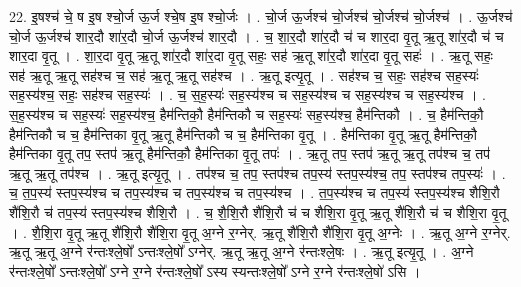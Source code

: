 \documentclass[17pt]{extarticle}
\begin{document}
22. इ॒षश्च॑ चे॒ ष इ॒ष श्चो॒र्ज ऊ॒र्ज श्चे॒ष इ॒ष श्चो॒र्जः । . चो॒र्ज ऊ॒र्जश्च॑ चो॒र्जश्च॑ चो॒र्जश्च॑ चो॒र्जश्च॑ । . ऊ॒र्जश्च॑ चो॒र्ज ऊ॒र्जश्च॑ शार॒दौ शा॑र॒दौ चो॒र्ज ऊ॒र्जश्च॑ शार॒दौ । . च॒ शा॒र॒दौ शा॑र॒दौ च॑ च शार॒दा वृ॒तू ऋ॒तू शा॑र॒दौ च॑ च शार॒दा वृ॒तू । . शा॒र॒दा वृ॒तू ऋ॒तू शा॑र॒दौ शा॑र॒दा वृ॒तू सहः॒ सह॑ ऋ॒तू शा॑र॒दौ शा॑र॒दा वृ॒तू सहः॑ । . ऋ॒तू सहः॒ सह॑ ऋ॒तू ऋ॒तू सह॑श्च च॒ सह॑ ऋ॒तू ऋ॒तू सह॑श्च । . ऋ॒तू इत्यृ॒तू । . सह॑श्च च॒ सहः॒ सह॑श्च सह॒स्यः॑ सह॒स्य॑श्च॒ सहः॒ सह॑श्च सह॒स्यः॑ । . च॒ स॒ह॒स्यः॑ सह॒स्य॑श्च च सह॒स्य॑श्च च सह॒स्य॑श्च च सह॒स्य॑श्च । . स॒ह॒स्य॑श्च च सह॒स्यः॑ सह॒स्य॑श्च॒ हैम॑न्तिकौ॒ हैम॑न्तिकौ च सह॒स्यः॑ सह॒स्य॑श्च॒ हैम॑न्तिकौ । . च॒ हैम॑न्तिकौ॒ हैम॑न्तिकौ च च॒ हैम॑न्तिका वृ॒तू ऋ॒तू हैम॑न्तिकौ च च॒ हैम॑न्तिका वृ॒तू । . हैम॑न्तिका वृ॒तू ऋ॒तू हैम॑न्तिकौ॒ हैम॑न्तिका वृ॒तू तप॒ स्तप॑ ऋ॒तू हैम॑न्तिकौ॒ हैम॑न्तिका वृ॒तू तपः॑ । . ऋ॒तू तप॒ स्तप॑ ऋ॒तू ऋ॒तू तप॑श्च च॒ तप॑ ऋ॒तू ऋ॒तू तप॑श्च । . ऋ॒तू इत्यृ॒तू । . तप॑श्च च॒ तप॒ स्तप॑श्च तप॒स्य॑ स्तप॒स्य॑श्च॒ तप॒ स्तप॑श्च तप॒स्यः॑ । . च॒ त॒प॒स्य॑ स्तप॒स्य॑श्च च तप॒स्य॑श्च च तप॒स्य॑श्च च तप॒स्य॑श्च । . त॒प॒स्य॑श्च च तप॒स्य॑ स्तप॒स्य॑श्च शैशि॒रौ शै॑शि॒रौ च॑ तप॒स्य॑ स्तप॒स्य॑श्च शैशि॒रौ । . च॒ शै॒शि॒रौ शै॑शि॒रौ च॑ च शैशि॒रा वृ॒तू ऋ॒तू शै॑शि॒रौ च॑ च शैशि॒रा वृ॒तू । . शै॒शि॒रा वृ॒तू ऋ॒तू शै॑शि॒रौ शै॑शि॒रा वृ॒तू अ॒ग्ने र॒ग्नेर्. ऋ॒तू शै॑शि॒रौ शै॑शि॒रा वृ॒तू अ॒ग्नेः । . ऋ॒तू अ॒ग्ने र॒ग्नेर्. ऋ॒तू ऋ॒तू अ॒ग्ने र॑न्तःश्ले॒षो᳚ ऽन्तःश्ले॒षो᳚ ऽग्नेर्. ऋ॒तू ऋ॒तू अ॒ग्ने र॑न्तःश्ले॒षः । . ऋ॒तू इत्यृ॒तू । . अ॒ग्ने र॑न्तःश्ले॒षो᳚ ऽन्तःश्ले॒षो᳚ ऽग्ने र॒ग्ने र॑न्तःश्ले॒षो᳚ ऽस्य स्यन्तःश्ले॒षो᳚ ऽग्ने र॒ग्ने र॑न्तःश्ले॒षो॑ ऽसि । \newline
\end{document}
